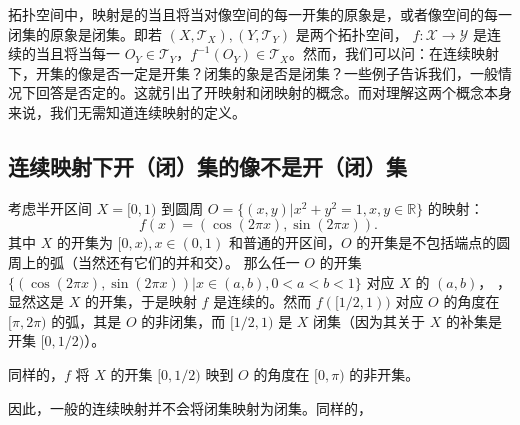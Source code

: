 
拓扑空间中，映射是的当且将当对像空间的每一开集的原象是，或者像空间的每一闭集的原象是闭集。即若 $(X,\mathcal T_X),(Y,\mathcal T_Y)$ 是两个拓扑空间， $f:\mathcal X\rightarrow\mathcal Y$ 是连续的当且将当每一 $O_Y\in\mathcal T_Y$，$f^{-1}(O_Y)\in\mathcal T_X$。然而，我们可以问：在连续映射下，开集的像是否一定是开集？闭集的象是否是闭集？一些例子告诉我们，一般情况下回答是否定的。这就引出了开映射和闭映射的概念。而对理解这两个概念本身来说，我们无需知道连续映射的定义。

\subsection{连续映射下开（闭）集的像不是开（闭）集}
\begin{example}{}
考虑半开区间 $X=[0,1)$ 到圆周 $O=\{(x,y)|x^2+y^2=1,x,y\in\mathbb R\}$ 的映射：
\begin{equation}
f(x)=(\cos(2\pi x),\sin(2\pi x)).~
\end{equation}
其中 $X$ 的开集为 $[0,x),x\in (0,1)$ 和普通的开区间，$O$ 的开集是不包括端点的圆周上的弧（当然还有它们的并和交）。
那么任一 $O$ 的开集 $\{(\cos(2\pi x),\sin(2\pi x))|x\in(a,b),0<a<b<1\}$ 对应 $X$ 的 $(a,b)$，
，显然这是 $X$ 的开集，于是映射 $f$ 是连续的。然而 $f([1/2,1))$ 对应 $O$ 的角度在 $[\pi,2\pi)$ 的弧，其是 $O$ 的非闭集，而 $[1/2,1)$ 是 $X$ 闭集（因为其关于 $X$ 的补集是开集 $[0,1/2)$）。

同样的，$f$ 将 $X$ 的开集 $[0,1/2)$ 映到 $O$ 的角度在 $[0,\pi)$ 的非开集。
\end{example}

因此，一般的连续映射并不会将闭集映射为闭集。同样的，
